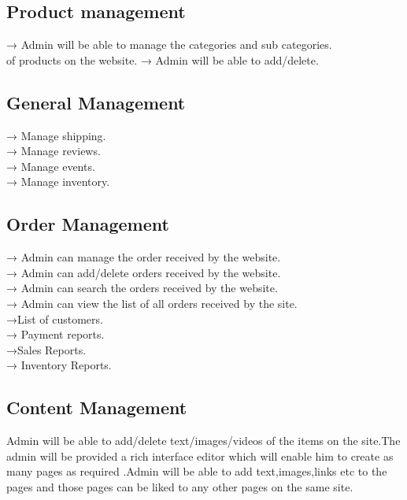 \documentclass{article}
\begin{document}
\subsection{Product management}
→ Admin will be able to manage the categories and sub categories.\\
of products on the website.
→ Admin will be able to add/delete.\\


\subsection{General Management}
 
→ Manage shipping.\\
→ Manage reviews.\\
→ Manage events.\\
→ Manage inventory.\\

\subsection{Order Management}
 
→ Admin can manage the order received by the website.\\
→ Admin can add/delete orders received by the website.\\
→ Admin can search the orders received by the website.\\
→ Admin can view the list of all orders received by the site.\\
→List of customers.\\
→ Payment reports.\\
→Sales Reports.\\
→ Inventory Reports.\\
















\subsection{Content Management}
Admin will be able to add/delete text/images/videos of the items
on the site.The admin will be provided a rich interface editor
which will enable him to create as many pages as required .Admin
will be able to add text,images,links etc to the pages and those
pages can be liked to any other pages on the same site.
\\
 
\end{document}
